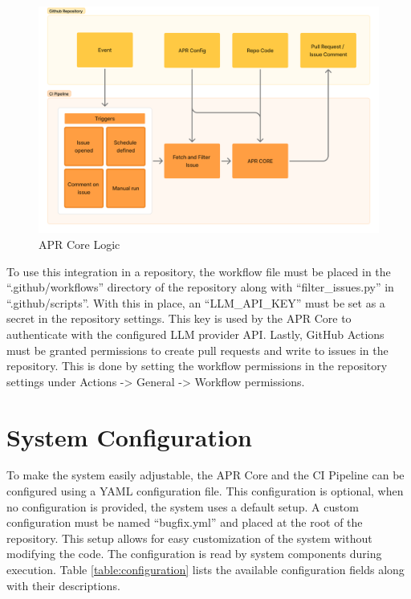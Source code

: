 \begin{figure}[H]
    \centering
    \includegraphics[width=1\textwidth]{images/flowcharts/ci.png}
    \caption{APR Core Logic}
    \label{fig:ci}
\end{figure}

To use this integration in a repository, the workflow file must be placed in the ``.github/workflows'' directory of the repository along with ``filter\_issues.py'' in ``.github/scripts''. With this in place, an ``LLM\_API\_KEY'' must be set as a secret in the repository settings. This key is used by the APR Core to authenticate with the configured \ac{LLM} provider API. Lastly, GitHub Actions must be granted permissions to create pull requests and write to issues in the repository. This is done by setting the workflow permissions in the repository settings under Actions -> General -> Workflow permissions.

\section{System Configuration}
To make the system easily adjustable, the APR Core and the CI Pipeline can be configured using a YAML configuration file. This configuration is optional, when no configuration is provided, the system uses a default setup. A custom configuration must be named ``bugfix.yml'' and placed at the root of the repository. This setup allows for easy customization of the system without modifying the code. The configuration is read by system components during execution. Table \ref{table:configuration} lists the available configuration fields along with their descriptions.

